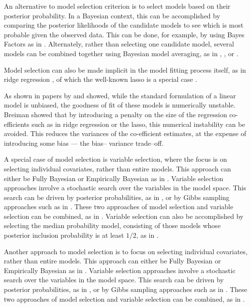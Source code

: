An alternative to model selection criterion is to select models based on their posterior probability. In a
Bayesian context, this can be accomplished by comparing the posterior likelihoods of the candidate models to
see which is most probable given the observed data. This can be done, for example, by using Bayes Factors as
in \citep{Kass1993}. Alternately, rather than selecting one candidate model, several models can be combined together using Bayesian model  averaging, as in \citep{Hoeting1999}, \citep{Raftery1997}, \citep{Fernandez2001} or \citep{Papaspiliopoulos2016}.

Model selection can also be made implicit in the model fitting process itself, as in ridge regression
\citep{Casella1980}, of which the well-known lasso is a special case \citep{Tibshirani1996}.

As shown in
papers by \citep{Breiman1996} and \citep{Efron2013} showed, while  the standard formulation of a linear model
is unbiased, the goodness of fit of these models is numerically  unstable. Breiman showed that by introducing
a penalty on the size of the regression co- efficients such as  in ridge regression or the lasso, this numerical
instability can be avoided. This reduces the variances of the co-efficient estimates, at the expense of
introducing some bias --- the bias-- variance trade--off.

A special case of model selection is variable selection, where the focus is on selecting individual
covariates, rather than entire models. This approach can either be Fully Bayesian or Empirically Bayesian as
in \citep{Cui2008}. Variable selection approaches involve a stochastic search over the variables in the model
space. This search can be driven by posterior probabilities, as in \citep{Casella2006}, or by Gibbs sampling
approaches such as in \citep{George1993}. These two approaches of model selection and variable selection can
be combined, as in \citep{Geweke1996}. Variable selection can also be accomplished by selecting the median
probability model, consisting of those models whose posterior inclusion probability is at least $1/2$, as in
\citep{Barbieri2004}.

Another approach to model selection is to focus on selecting individual covariates, rather than entire
models. This approach can either be Fully Bayesian or Empirically Bayesian as in \citep{Cui2008}. Variable
selection approaches involve a stochastic search over the variables in the model space. This search can be
driven by posterior probabilities, as in \citep{Casella2006}, or by Gibbs sampling approaches such as in
\citep{George1993}. These two approaches of model selection and variable selection can be combined, as in
\citep{Geweke1996}.

